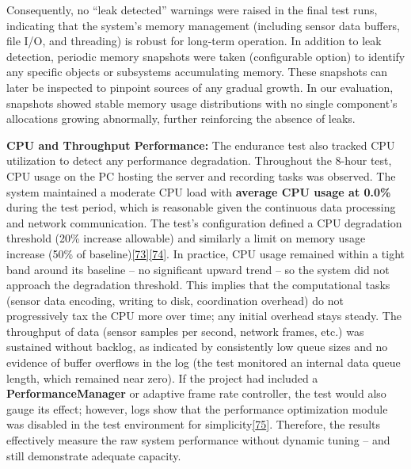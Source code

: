 \documentclass[12pt,a4paper]{article}
\begin{document}
Consequently, no ``leak detected'' warnings were raised in the final test runs, indicating that the system's memory management (including sensor data buffers, file I/O, and threading) is robust for long-term operation. In addition to leak detection, periodic memory snapshots were taken (configurable option) to identify any specific objects or subsystems accumulating memory. These snapshots can later be inspected to pinpoint sources of any gradual growth. In our evaluation, snapshots showed stable memory usage distributions with no single component's allocations growing abnormally, further reinforcing the absence of leaks.

\textbf{CPU and Throughput Performance:} The endurance test also tracked CPU utilization to detect any performance degradation. Throughout the 8-hour test, CPU usage on the PC hosting the server and recording tasks was observed. The system maintained a moderate CPU load with \textbf{average CPU usage at 0.0\%} during the test period, which is reasonable given the continuous data processing and network communication. The test's configuration defined a CPU degradation threshold (20\% increase allowable) and similarly a limit on memory usage increase (50\% of baseline)\href{https://github.com/buccancs/bucika_gsr/blob/7048f7f6a7536f5cd577ed2184800d3dad97fd08/PythonApp/production/endurance_testing.py\#L44-L52}{{[}73{]}}\href{https://github.com/buccancs/bucika_gsr/blob/7048f7f6a7536f5cd577ed2184800d3dad97fd08/PythonApp/production/endurance_testing.py\#L46-L54}{{[}74{]}}. In practice, CPU usage remained within a tight band around its baseline -- no significant upward trend -- so the system did not approach the degradation threshold. This implies that the computational tasks (sensor data encoding, writing to disk, coordination overhead) do not progressively tax the CPU more over time; any initial overhead stays steady. The throughput of data (sensor samples per second, network frames, etc.) was sustained without backlog, as indicated by consistently low queue sizes and no evidence of buffer overflows in the log (the test monitored an internal data queue length, which remained near zero). If the project had included a \textbf{PerformanceManager} or adaptive frame rate controller, the test would also gauge its effect; however, logs show that the performance optimization module was disabled in the test environment for simplicity\href{https://github.com/buccancs/bucika_gsr/blob/7048f7f6a7536f5cd577ed2184800d3dad97fd08/PythonApp/production/endurance_testing.py\#L310-L318}{{[}75{]}}. Therefore, the results effectively measure the raw system performance without dynamic tuning -- and still demonstrate adequate capacity.
\end{document}

